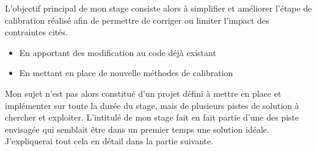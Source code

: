 L’objectif principal de mon stage consiste alors à simplifier et améliorer l’étape de calibration réalisé afin de permettre  de corriger ou limiter l’impact des contraintes cités.
\begin{itemize}
    \item En apportant des modification au code déjà existant
    \item En mettant en place de nouvelle méthodes de calibration
\end{itemize}

Mon sujet n’est pas alors constitué d'un projet défini à mettre en place et implémenter sur toute la durée du stage, mais de plusieurs pistes de solution à chercher et exploiter. L'intitulé de mon stage fait en fait partie d'une des piste envisagée qui semblait être dans un premier temps une solution idéale. J'expliquerai tout cela en détail dans la partie suivante.

